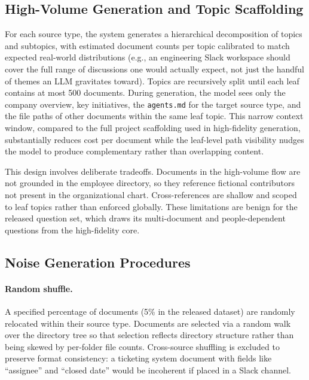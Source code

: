 \documentclass{article}
\begin{document}
\subsection{High-Volume Generation and Topic Scaffolding}
\label{app:highvolume}

For each source type, the system generates a hierarchical decomposition of topics and subtopics, with estimated document counts per topic calibrated to match expected real-world distributions (e.g., an engineering Slack workspace should cover the full range of discussions one would actually expect, not just the handful of themes an LLM gravitates toward). Topics are recursively split until each leaf contains at most 500 documents. During generation, the model sees only the company overview, key initiatives, the \texttt{agents.md} for the target source type, and the file paths of other documents within the same leaf topic. This narrow context window, compared to the full project scaffolding used in high-fidelity generation, substantially reduces cost per document while the leaf-level path visibility nudges the model to produce complementary rather than overlapping content.

This design involves deliberate tradeoffs. Documents in the high-volume flow are not grounded in the employee directory, so they reference fictional contributors not present in the organizational chart. Cross-references are shallow and scoped to leaf topics rather than enforced globally. These limitations are benign for the released question set, which draws its multi-document and people-dependent questions from the high-fidelity core.

\subsection{Noise Generation Procedures}
\label{app:noise_procedures}

\paragraph{Random shuffle.}
A specified percentage of documents (5\% in the released dataset) are randomly relocated within their source type. Documents are selected via a random walk over the directory tree so that selection reflects directory structure rather than being skewed by per-folder file counts. Cross-source shuffling is excluded to preserve format consistency: a ticketing system document with fields like ``assignee'' and ``closed date'' would be incoherent if placed in a Slack channel.
\end{document}
